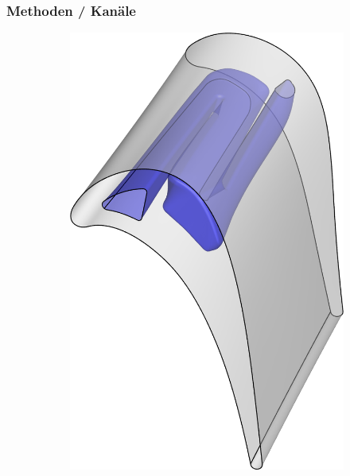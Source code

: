 \documentclass[8pt, aspectratio=169]{beamer}
\begin{document}
\begin{frame}
	\frametitle{Methoden / Kanäle}
	\vspace{-1cm}\hspace{2.5cm}
	\begin{figure}
		\centering
		\begin{subfigure}{.49\textwidth}
			\phantom{aaaaaaa}
			\includegraphics[height=.8\textheight]{../tec/channel/14.png}
		\end{subfigure}
		\begin{subfigure}{.49\textwidth}

\end{subfigure}
\end{figure}
\end{frame}
\end{document}
